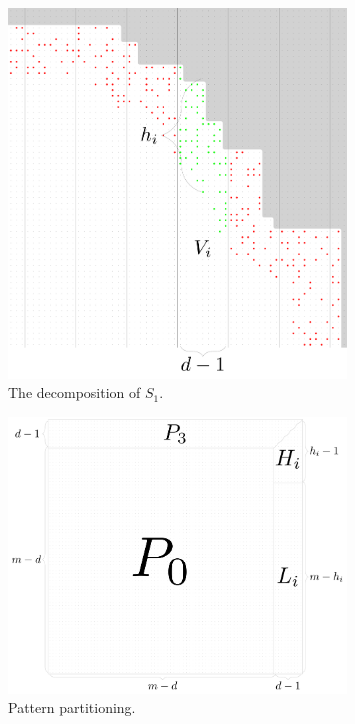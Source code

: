 \documentclass[11pt]{article}
\theoremstyle{plain}
\theoremstyle{definition}
\theoremstyle{remark}
\begin{document}
\begin{figure}[!t]
	\begin{center}
		\includegraphics[width=0.8\textwidth]{drawings/periphery_decomposition}
	\end{center}
	\caption{The decomposition of $S_1$.}
	\label{figure:periphery_decomposition}
\end{figure}

\begin{figure}[!t]
	\begin{center}
		\includegraphics[width=0.8\textwidth]{drawings/pattern_restriction}
	\end{center}
	\caption{Pattern partitioning.}
	\label{figure:pattern_restriction}
\end{figure}
\end{document}
